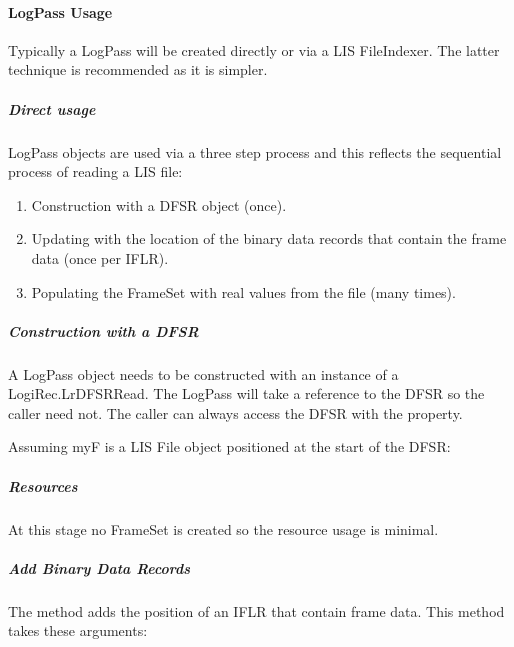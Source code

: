 \documentclass[letterpaper,10pt,english]{sphinxmanual}
\begin{document}
\paragraph{LogPass Usage}
\label{\detokenize{ref/LIS/core/LogPass:logpass-usage}}
Typically a LogPass will be created directly or via a LIS FileIndexer. The latter technique is recommended as it is simpler.


\subparagraph{Direct usage}
\label{\detokenize{ref/LIS/core/LogPass:direct-usage}}
LogPass objects are used via a three step process and this reflects the sequential process of reading a LIS file:
\begin{enumerate}
\item {} 
Construction with a DFSR object (once).

\item {} 
Updating with the location of the binary data records that contain the frame data (once per IFLR).

\item {} 
Populating the FrameSet with real values from the file (many times).

\end{enumerate}


\subparagraph{Construction with a DFSR}
\label{\detokenize{ref/LIS/core/LogPass:construction-with-a-dfsr}}
A LogPass object needs to be constructed with an instance of a LogiRec.LrDFSRRead. The LogPass will take a reference to the DFSR so the caller need not. The caller can always access the DFSR with the  property.

Assuming myF is a LIS File object positioned at the start of the DFSR:

\begin{sphinxVerbatim}[commandchars=\\\{\}]
   
\end{sphinxVerbatim}


\subparagraph{Resources}
\label{\detokenize{ref/LIS/core/LogPass:resources}}
At this stage no FrameSet is created so the resource usage is minimal.


\subparagraph{Add Binary Data Records}
\label{\detokenize{ref/LIS/core/LogPass:add-binary-data-records}}
The method  adds the position of an IFLR that contain frame data. This method takes these arguments:
\end{document}
